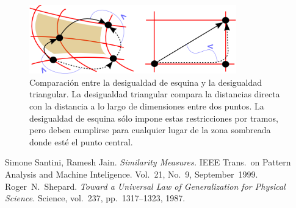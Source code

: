 \documentclass[spanish]{article}
\begin{document}
\begin{figure}[t]
  \centering
  \includegraphics[width=0.8\textwidth]{imagenes/esquina.png}
  \caption{\small %
    Comparación entre la desigualdad de esquina y la desigualdad
    triangular.  La desigualdad triangular compara la distancias directa con
    la distancia a lo largo de dimensiones entre dos puntos.  La desigualdad de
    esquina sólo impone estas restricciones por tramos, pero deben cumplirse
    para cualquier lugar de la zona sombreada donde esté el punto central.
  }
  \label{fig:esquina}
\end{figure}




\begin{thebibliography}{99}
        Simone Santini, Ramesh Jain.
        \emph{Similarity Measures.}
        IEEE Trans.~on Pattern Analysis and Machine Inteligence.
        Vol.~21, No.~9, September~1999.
        Roger~{}N.~Shepard.
        \emph{Toward a Universal Law of Generalization for Physical Science.}
        Science, vol.~237, pp.~1317--1323, 1987.
\end{thebibliography}
\end{document}
